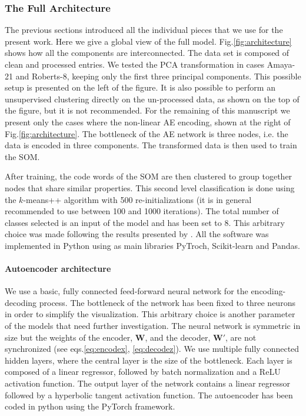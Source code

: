 \subsubsection{The Full Architecture}
\label{sec:fullarchi}
The previous sections introduced all the individual pieces that we use for the present work. Here we give a global view of the full model. Fig.\ref{fig:architecture} shows how all the components are interconnected. The data set is composed of clean and processed entries. We tested the PCA transformation in cases Amaya-21 and Roberts-8, keeping only the first three principal components. This possible setup is presented on the left of the figure. It is also possible to perform an unsupervised clustering directly on the un-processed data, as shown on the top of the figure, but it is not recommended. For the remaining of this manuscript we present only the cases where the non-linear AE encoding, shown at the right of Fig.\ref{fig:architecture}. The bottleneck of the AE network is three nodes, i.e. the data is encoded in three components. The transformed data is then used to train the SOM.

After training, the code words of the SOM are then clustered to group together nodes that share similar properties. This second level classification is done using the $k$-means++ algorithm with 500 re-initializations (it is in general recommended to use between 100 and 1000 iterations). The total number of classes selected is an input of the model and has been set to 8. This arbitrary choice was made following the results presented by \citep{Roberts2020}. All the software was implemented in Python using as main libraries PyTroch, Scikit-learn and Pandas.

\paragraph{Autoencoder architecture}
We use a basic, fully connected feed-forward neural network for the encoding-decoding process. The bottleneck of the network has been fixed to three neurons in order to simplify the visualization. This arbitrary choice is another parameter of the models that need further investigation. The neural network is symmetric in size but the weights of the encoder, $\boldsymbol{W}$, and the decoder, $\boldsymbol{W'}$, are not synchronized (see eqs.\eqref{eq:encodex}, \eqref{eq:decodez}). We use multiple fully connected hidden layers, where the central layer is the size of the bottleneck. Each layer is composed of a linear regressor, followed by batch normalization and a ReLU activation function. The output layer of the network contains a linear regressor followed by a hyperbolic tangent activation function. The autoencoder has been coded in python using the PyTorch framework.

